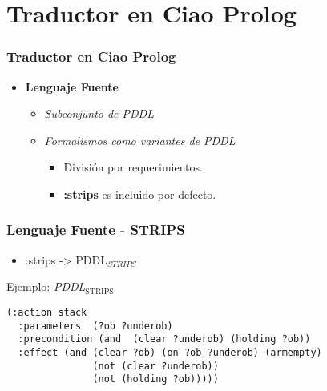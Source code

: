 \documentclass[bigger]{beamer}
\begin{document}
\section{Traductor en Ciao Prolog}
\label{sec-3}
\begin{frame}[<+->]
\frametitle{Traductor en Ciao Prolog}
\label{sec-3.1}
\begin{itemize}

\item \textbf{Lenguaje Fuente}
\label{sec-3.1.1}%
\begin{itemize}

\item \emph{Subconjunto de PDDL}\\
\label{sec-3.1.1.1}%
\item \emph{Formalismos como variantes de PDDL}
\label{sec-3.1.1.2}%
\begin{itemize}

\item División por requerimientos.\\
\label{sec-3.1.1.2.1}%
\item \textbf{:strips} es incluido por defecto.\\
\label{sec-3.1.1.2.2}%
\end{itemize} %
\end{itemize} %
\end{itemize} %
\end{frame}
\begin{frame}[fragile,<+->]
\frametitle{Lenguaje Fuente - STRIPS}
\label{sec-3.2}
\begin{itemize}

\item :strips -> PDDL$_{STRIPS}$\\
\label{sec-3.2.1}%
\end{itemize} %
\begin{block}{Ejemplo: \emph{PDDL$_{\mathrm{STRIPS}}$}}
\label{sec-3.2.2}

 \begin{verbatim}
(:action stack
  :parameters  (?ob ?underob)
  :precondition (and  (clear ?underob) (holding ?ob))
  :effect (and (clear ?ob) (on ?ob ?underob) (armempty)
               (not (clear ?underob)) 
               (not (holding ?ob)))))
 \end{verbatim}
\end{block}
\end{frame}
\end{document}
